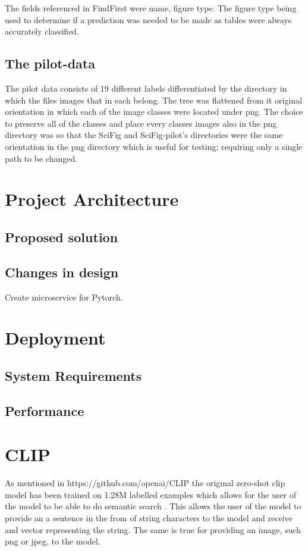\documentclass[article, 10pt]{article}
\begin{document}
The fields referenced in FindFirst were name, figure type. The figure type being used to determine if a prediction was needed to be made as tables were always accurately classified. 

\subsection{The pilot-data}
The pilot data consists of 19 different labels differentiated by the directory in which the files images that in each belong. The tree was flattened from it original orientation in which each of the image classes were located under png. The choice to preserve all of the classes and place every classes images also in the png directory was so that the SciFig and SciFig-pilot's directories were the same orientation in the png directory which is useful for testing; requiring only a single path to be changed. 

\section{Project Architecture}

\subsection{Proposed solution}

\subsection{Changes in design}
Create microservice for Pytorch.

\section{Deployment}

\subsection{System Requirements}

\subsection{Performance}

\section{CLIP}
As mentioned in https://github.com/openai/CLIP the original zero-shot clip model has been
trained on 1.28M labelled examples which allows for the user of the model to be able to do
semantic search \cite{OpenAI}. This allows the user of the model to provide an a sentence in 
the from of string characters to the model and receive and vector representing the string. The 
same is true for providing an image, such png or jpeg, to the model. 
\end{document}
